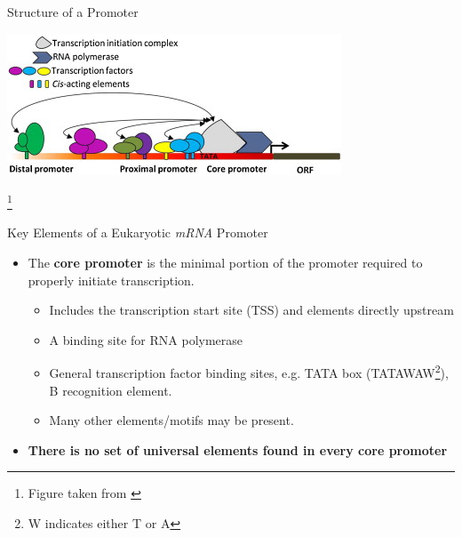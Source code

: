 \documentclass[aspectratio=169,11pt]{beamer}
\newcommand\blfootnote[1]{%
  \begingroup
  \renewcommand\thefootnote{}\footnote{#1}%
  \addtocounter{footnote}{-1}%
  \endgroup
}
\begin{document}
\begin{frame}{Structure of a Promoter}

	\begin{center}
	\includegraphics[scale=0.9]{figures/allPromoters.jpg} 
	\end{center}

	\vspace{5mm}
	
	\blfootnote{Figure taken from \cite{HERNANDEZGARCIA2014109}}

\end{frame}

\begin{frame}{Key Elements of a Eukaryotic \textit{mRNA} Promoter}

	\begin{itemize}
		\item The \textbf{core promoter} is the minimal portion of the promoter required to properly initiate transcription.
	
		\begin{itemize}
			\item Includes the transcription start site (TSS) and elements directly upstream
			\item A binding site for RNA polymerase
			\item General transcription factor binding sites, e.g. TATA box (TATAWAW\footnote{W indicates either T or A}), B recognition element.
			\item Many other elements/motifs may be present. 
		\end{itemize}
		
		\item \textbf{There is no set of universal elements found in every core promoter}
		
	\end{itemize}

\end{frame}
\end{document}
